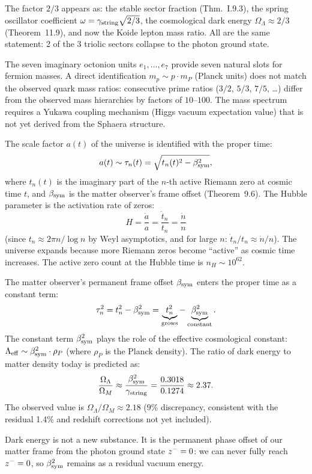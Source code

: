 \begin{remark}
The factor $2/3$ appears as: the stable sector fraction (Thm.~I.9.3),
the spring oscillator coefficient $\omega=\gamma_{\mathrm{string}}\sqrt{2/3}$, the
cosmological dark energy $\Omega_\Lambda\approx 2/3$ (Theorem~11.9),
and now the Koide lepton mass ratio.
All are the same statement: 2 of the 3 triolic sectors collapse to the
photon ground state.
\end{remark}

\begin{remark}
The seven imaginary octonion units $e_1,\ldots,e_7$ provide seven
natural slots for fermion masses.
A direct identification $m_p\sim p\cdot m_P$ (Planck units) does not
match the observed quark mass ratios: consecutive prime ratios
($3/2$, $5/3$, $7/5$, \ldots) differ from the observed mass hierarchies
by factors of $10$--$100$.
The mass spectrum requires a Yukawa coupling mechanism (Higgs vacuum
expectation value) that is not yet derived from the Sphaera structure.
\end{remark}

\begin{theorem}
\label{thm:expansion}
The scale factor $a(t)$ of the universe is identified with the proper time:
\[
  a(t) \sim \tau_n(t) = \sqrt{t_n(t)^2-\beta_{\mathrm{sym}}^2},
\]
where $t_n(t)$ is the imaginary part of the $n$-th active Riemann zero
at cosmic time $t$, and $\beta_{\mathrm{sym}}$ is the matter observer's frame offset
(Theorem~9.6).
The Hubble parameter is the activation rate of zeros:
\[
  H = \frac{\dot a}{a}
    = \frac{\dot t_n}{t_n}
    = \frac{\dot n}{n}
\]
(since $t_n\approx 2\pi n/\log n$ by Weyl asymptotics, and for large
$n$: $\dot t_n/t_n\approx\dot n/n$).
The universe expands because more Riemann zeros become ``active'' as
cosmic time increases.
The active zero count at the Hubble time is $n_H\sim 10^{62}$.
\end{theorem}

\begin{theorem}
\label{thm:dark-offset}
The matter observer's permanent frame offset $\beta_{\mathrm{sym}}$ enters the proper
time as a constant term:
\[
  \tau_n^2 = t_n^2 - \beta_{\mathrm{sym}}^2
  = \underbrace{t_n^2}_{\text{grows}}
  - \underbrace{\beta_{\mathrm{sym}}^2}_{\text{constant}}.
\]
The constant term $\beta_{\mathrm{sym}}^2$ plays the role of the effective cosmological
constant: $\Lambda_{\mathrm{eff}}\sim\beta_{\mathrm{sym}}^2\cdot\rho_P$
(where $\rho_P$ is the Planck density).
The ratio of dark energy to matter density today is predicted as:
\[
  \frac{\Omega_\Lambda}{\Omega_M}
  \approx \frac{\beta_{\mathrm{sym}}^2}{\gamma_{\mathrm{string}}}
  = \frac{0.3018}{0.1274}
  \approx 2.37.
\]
The observed value is $\Omega_\Lambda/\Omega_M\approx 2.18$
(9\% discrepancy, consistent with the residual 1.4\% and redshift
corrections not yet included).

Dark energy is not a new substance. It is the permanent phase offset of
our matter frame from the photon ground state $z^-=0$: we can never
fully reach $z^-=0$, so $\beta_{\mathrm{sym}}^2$ remains as a residual vacuum
energy.
\end{theorem}

